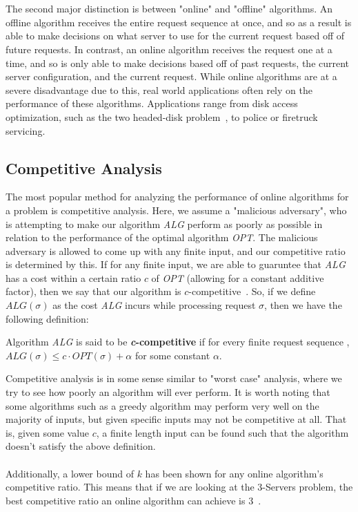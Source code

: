 \\ \\
The second major distinction is between "online" and "offline" algorithms. An offline algorithm receives the entire request sequence at once, and so as a result is able to make decisions on what server to use for the current request based off of future requests. In contrast, an online algorithm receives the request one at a time, and so is only able to make decisions based off of past requests, the current server configuration, and the current request. While online algorithms are at a severe disadvantage due to this, real world applications often rely on the performance of these algorithms. Applications range from disk access optimization, such as the two headed-disk problem~\cite{OnlineComp1998}, to police or firetruck servicing.

\subsection{Competitive Analysis}
\label{sec:compAna}
The most popular method for analyzing the performance of online algorithms for a problem is competitive analysis. Here, we assume a "malicious adversary", who is attempting to make our algorithm \textit{ALG} perform as poorly as possible in relation to the performance of the optimal algorithm \textit{OPT}. The malicious adversary is allowed to come up with any finite input, and our competitive ratio is determined by this. If for any finite input, we are able to guaruntee that \textit{ALG} has a cost within a certain ratio $c$ of \textit{OPT} (allowing for a constant additive factor), then we say that our algorithm is $c$-competitive~\cite{OnlineComp1998}. So, if we define $ALG(\sigma)$ as the cost \textit{ALG} incurs while processing request $\sigma$, then we have the following definition: 

\begin{definition}
\label{def:comp}
Algorithm \textit{ALG} is said to be \textbf{\textit{c}-competitive} if for every finite request sequence \s, $ALG(\sigma) \leq c\cdot OPT(\sigma)+\alpha$ for some constant $\alpha$.
\end{definition}

Competitive analysis is in some sense similar to "worst case" analysis, where we try to see how poorly an algorithm will ever perform. It is worth noting that some algorithms such as a greedy algorithm may perform very well on the majority of inputs, but given specific inputs may not be competitive at all. That is, given some value $c$, a finite length input can be found such that the algorithm doesn't satisfy the above definition. 
\\ \\
Additionally, a lower bound of $k$ has been shown for any online algorithm's competitive ratio. This means that if we are looking at the 3-Servers problem, the best competitive ratio an online algorithm can achieve is 3~\cite{OnlineComp1998}.


